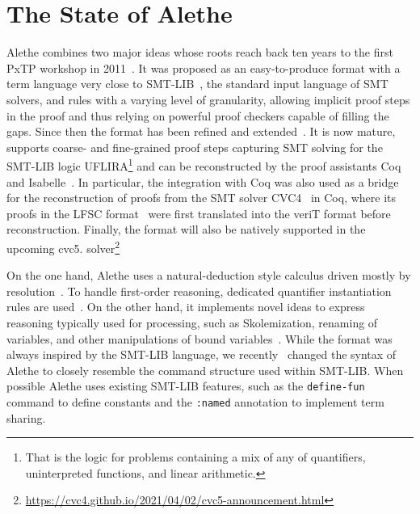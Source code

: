 \documentclass[submission,copyright,creativecommons]{eptcs}
\begin{document}
\section{The State of Alethe}

Alethe combines two major ideas
whose roots reach back ten years to the first PxTP workshop in
2011~\cite{besson-2011,deharbe-2011}.
It was proposed as
an easy-to-produce format with a term language very close to
SMT-LIB~\cite{SMTLIB}, the standard input language of SMT solvers, and rules
with a varying level of granularity, allowing implicit proof steps in the proof
and thus relying on powerful proof checkers capable of filling the gaps.
%
Since then the format has been refined and extended~\cite{barbosa-2019}. It is now
mature, supports coarse- and fine-grained proof steps capturing
SMT solving for the SMT-LIB logic UFLIRA\footnote{That is the logic for
  problems containing a mix of any of quantifiers,
  uninterpreted
  functions, and linear arithmetic.} and can be reconstructed by the proof
assistants Coq~\cite{Armand2011,SMTCoq} and
Isabelle~\cite{fleury-2019,schurr-2021}.
%
In particular, the integration with Coq was also used as a bridge for the
reconstruction of proofs from the SMT solver CVC4~\cite{Barrett2011} in
Coq, where its proofs in the LFSC format~\cite{Stump2013} were
first translated into the veriT format before reconstruction.
%
Finally, the format will also be natively supported in the upcoming cvc5.
solver\footnote{\url{https://cvc4.github.io/2021/04/02/cvc5-announcement.html}}

On the one hand, Alethe uses a
natural-deduction style calculus driven mostly by resolution~\cite{besson-2011}.
To handle
first-order reasoning, dedicated quantifier instantiation rules are used~\cite{deharbe-2011}.
On the other hand, it
implements novel ideas to express reasoning typically used for processing,
such as Skolemization, renaming of variables, and other manipulations
of bound variables~\cite{barbosa-2019}.
While the format was always inspired by the SMT-LIB language,
we recently~\cite{fleury-2019} changed
the syntax of Alethe to closely resemble the command structure
used within SMT-LIB. When possible Alethe uses existing SMT-LIB features,
such as the \texttt{define-fun} command to define constants and the \texttt{:named}
annotation to implement term sharing.
\end{document}

